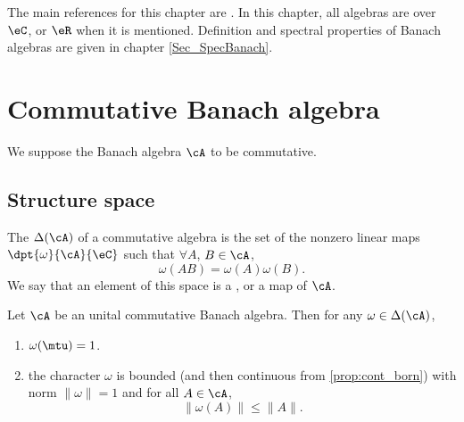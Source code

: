 
The main references for this chapter are \cite{Dixmier,Landsman}. In this chapter, all algebras are over $\eC$, or $\eR$ when it is mentioned. Definition and spectral properties of Banach algebras are given in chapter \ref{Sec_SpecBanach}.

\section{Commutative Banach algebra}

We suppose the Banach algebra $\cA$ to be commutative.

\subsection{Structure space}

\begin{definition}      \label{DefStructureSpaceDel}
    The  $\Delta(\cA)$ of a commutative algebra is the set of the nonzero linear maps $\dpt{\omega}{\cA}{\eC}$ such that $\forall A$, $B\in\cA$,
\[
    \omega(AB)=\omega(A)\omega(B).
\]
We say that an element of this space is a , or a  map of $\cA$.
\end{definition}

\begin{proposition}
Let $\cA$ be an unital commutative Banach algebra. Then for any $\omega\in\Delta(\cA)$,
\begin{enumerate}

\item $\omega(\mtu)=1$.
\item the character $\omega$ is bounded (and then continuous from \ref{prop:cont_born}) with norm $\|\omega\|=1$ and for all $A\in\cA$,
\begin{equation} \label{eq:omAleqnA}
  \|\omega(A)\|\leq \|A\|.
\end{equation}
\end{enumerate}
\end{proposition}


